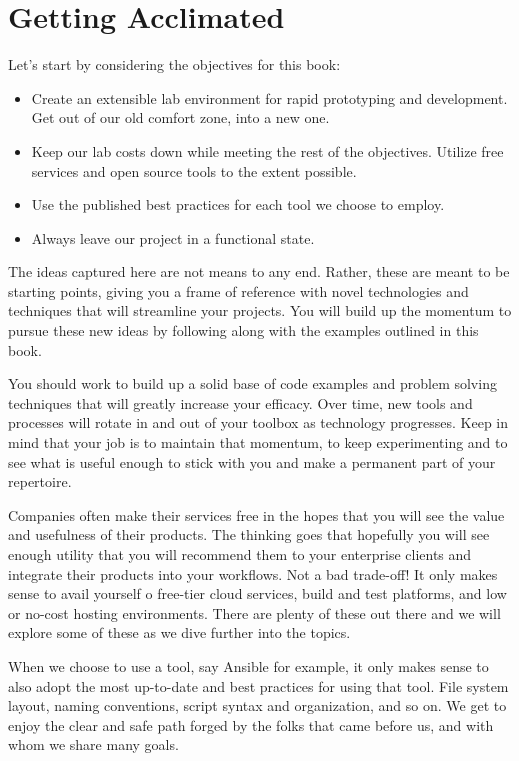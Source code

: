 \chapter{Getting Acclimated}

\justify
Let's start by considering the objectives for this book:

\begin{itemize}
\item
  Create an extensible lab environment for rapid prototyping and
  development. Get out of our old comfort zone, into a new one.
\item
  Keep our lab costs down while meeting the rest of the objectives.
  Utilize free services and open source tools to the extent possible.
\item
  Use the published best practices for each tool we choose to employ.
\item
  Always leave our project in a functional state.
\end{itemize}

\justify
The ideas captured here are not means to any end. Rather, these are meant to be starting points, giving you a frame of reference with novel technologies and techniques that will streamline your projects. You will build up the momentum to pursue these new ideas by following along with the examples outlined in this book.

\justify
You should work to build up a solid base of code examples and problem solving techniques that will greatly increase your efficacy. Over time, new tools and processes will rotate in and out of your toolbox as technology progresses. Keep in mind that your job is to maintain that momentum, to keep experimenting and to see what is useful enough to stick with you and make a permanent part of your repertoire.

\justify
Companies often make their services free in the hopes that you will see the value and usefulness of their products. The thinking goes that hopefully you will see enough utility that you will recommend them to your enterprise clients and integrate their products into your workflows. Not a bad trade-off! It only makes sense to avail yourself o free-tier cloud services, build and test platforms, and low or no-cost hosting environments. There are plenty of these out there and we will explore some of these as we dive further into the topics.

\justify
When we choose to use a tool, say Ansible for example, it only makes sense to also adopt the most up-to-date and best practices for using that tool. File system layout, naming conventions, script syntax and organization, and so on. We get to enjoy the clear and safe path forged by the folks that came before us, and with whom we share many goals.

